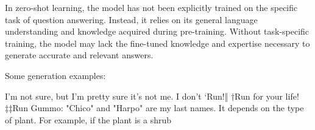 In zero-shot learning, the model has not been explicitly trained on the specific task of question answering. Instead, it relies on its general language understanding and knowledge acquired during pre-training. Without task-specific training, the model may lack the fine-tuned knowledge and expertise necessary to generate accurate and relevant answers.


Some generation examples:

I'm not sure, but I'm pretty sure it's not me. I don't
‘Run!‖ †Run for your life! ‡‡Run
Gummo: "Chico" and "Harpo" are my last names.
It depends on the type of plant. For example, if the plant is a shrub

